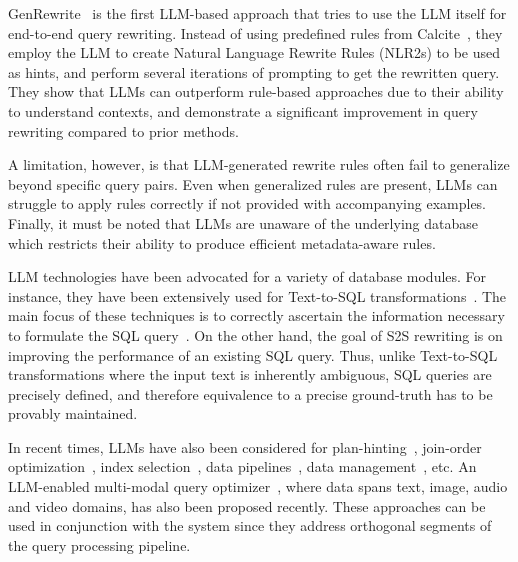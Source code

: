 GenRewrite~\cite{Genrewrite} is the first LLM-based approach that tries to use the LLM itself for end-to-end query rewriting.
Instead of using predefined rules from Calcite~\cite{Calcite}, they employ the LLM to create Natural Language Rewrite Rules (NLR2s) to be used as hints, and perform several iterations of prompting to get the rewritten query. 
They show that LLMs can outperform rule-based approaches due to their ability to understand contexts, and demonstrate a significant improvement in query rewriting compared to prior methods. 

A limitation, however, is that LLM-generated rewrite rules often fail to generalize beyond specific query pairs. Even when generalized rules are present,  LLMs can struggle to apply rules correctly if not provided with accompanying examples. Finally, it must be noted that LLMs are unaware of the underlying database which restricts their ability to produce efficient metadata-aware rules. 

LLM technologies have been advocated for a variety of database modules. For instance, they have been extensively used for Text-to-SQL transformations~\cite{BIRD, DB-GPT, sqleval, sqlcoder,2024CHESSpaper,DBGPT}.
The main focus of these techniques is to correctly ascertain the information necessary to formulate the SQL query~\cite{MACSQL,DINSQL,2024CHESSpaper}.
On the other hand, the goal of S2S rewriting is on improving the performance of an existing SQL query.  Thus, unlike Text-to-SQL transformations where the input text is inherently ambiguous, SQL queries are precisely defined, and therefore
equivalence to a precise ground-truth has to be provably maintained. 

In recent times, LLMs have also been considered for plan-hinting~\cite{LLMplanhint}, join-order optimization~\cite{LLMjoinorder}, index selection~\cite{DBGPT}, data pipelines~\cite{LLM_as_interface_for_data_pipeline}, data management~\cite{LLM_for_Data_Management}, etc.  An LLM-enabled multi-modal query optimizer~\cite{multi_model_query_optimizer}, where data spans text, image, audio and video domains, has also been proposed recently. These approaches can be used in conjunction with the \lithe system since they address orthogonal segments of the query processing pipeline.